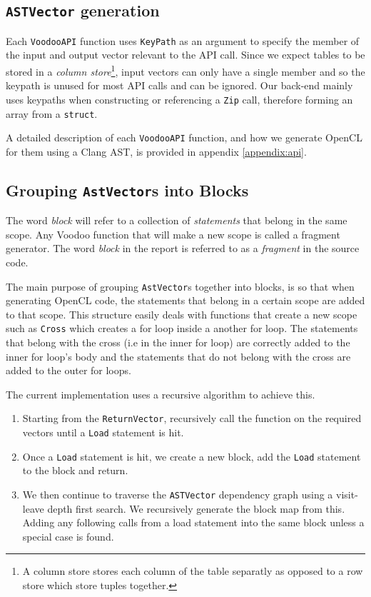 \subsection{\texttt{ASTVector} generation}

Each \texttt{VoodooAPI} function uses \texttt{KeyPath} as an argument to specify the member of the input and output vector relevant to the API call. Since we expect tables to be stored in a \emph{column store}\footnote{A column store stores each column of the table separatly as opposed to a row store which store tuples together.}, input vectors can only have a single member and so the keypath is unused for most API calls and can be ignored. Our back-end mainly uses keypaths when constructing or referencing a \texttt{Zip} call, therefore forming an array from a \texttt{struct}.

A detailed description of each \texttt{VoodooAPI} function, and how we generate OpenCL for them using a Clang AST, is provided in appendix \ref{appendix:api}.

\subsection{Grouping \texttt{AstVector}s into Blocks}
The word \emph{block} will refer to a collection of \emph{statements} that belong in the same scope. Any Voodoo function that will make a new scope is called a fragment generator. The word \emph{block} in the report is referred to as a \emph{fragment} in the source code.

The main purpose of grouping \texttt{AstVector}s together into blocks, is so that when generating OpenCL code, the statements that belong in a certain scope are added to that scope.
This structure easily deals with functions that create a new scope such as \texttt{Cross} which creates a for loop inside a another for loop. The statements that belong with the cross (i.e in the inner for loop) are correctly added to the inner for loop's body and the statements that do not belong with the cross are added to the outer for loops.

The current implementation uses a recursive algorithm to achieve this. 

\begin{enumerate}
    \item Starting from the \texttt{ReturnVector}, recursively call the function on the required vectors until a \texttt{Load} statement is hit.
    \item Once a \texttt{Load} statement is hit, we create a new block, add the \texttt{Load} statement to the block and return.
    \item We then continue to traverse the \texttt{ASTVector} dependency graph using a visit-leave depth first search. We recursively generate the block map from this. Adding any following calls from a load statement into the same block unless a special case is found. 
\end{enumerate}

